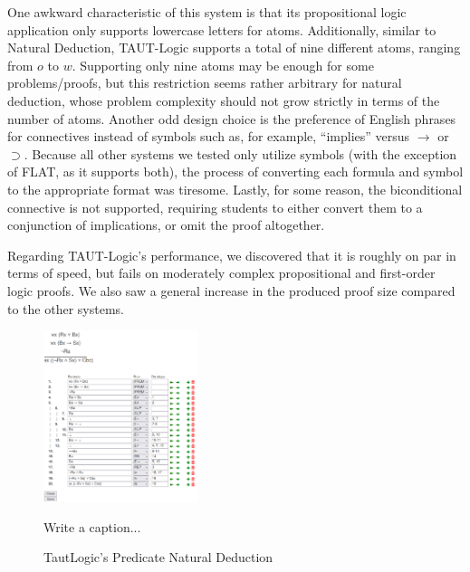 \documentclass[ms]{uncgdissertationexp2}
\theoremstyle{plain}
\theoremstyle{definition}
\theoremstyle{remark}
\begin{document}
One awkward characteristic of this system is that its propositional logic application only supports lowercase letters for atoms. Additionally, similar to Natural Deduction, TAUT-Logic supports a total of nine different atoms, ranging from $o$ to $w$. Supporting only nine atoms may be enough for some problems/proofs, but this restriction seems rather arbitrary for natural deduction, whose problem complexity should not grow strictly in terms of the number of atoms. Another odd design choice is the preference of English phrases for connectives instead of symbols such as, for example, ``implies'' versus $\to$ or $\supset$. Because all other systems we tested only utilize symbols (with the exception of FLAT, as it supports both), the process of converting each formula and symbol to the appropriate format was tiresome. Lastly, for some reason, the biconditional connective is not supported, requiring students to either convert them to a conjunction of implications, or omit the proof altogether. 
    
Regarding TAUT-Logic's performance, we discovered that it is roughly on par in terms of speed, but fails on moderately complex propositional and first-order logic proofs. We also saw a general increase in the produced proof size compared to the other systems. 
\begin{figure}[!ht]
	\centering
	\includegraphics[width=0.4\textwidth]{tautlogic.png}
	\caption{TautLogic's Predicate Natural Deduction}{Write a caption...}
	\label{fig:tautlogic}
\end{figure} 
\end{document}
